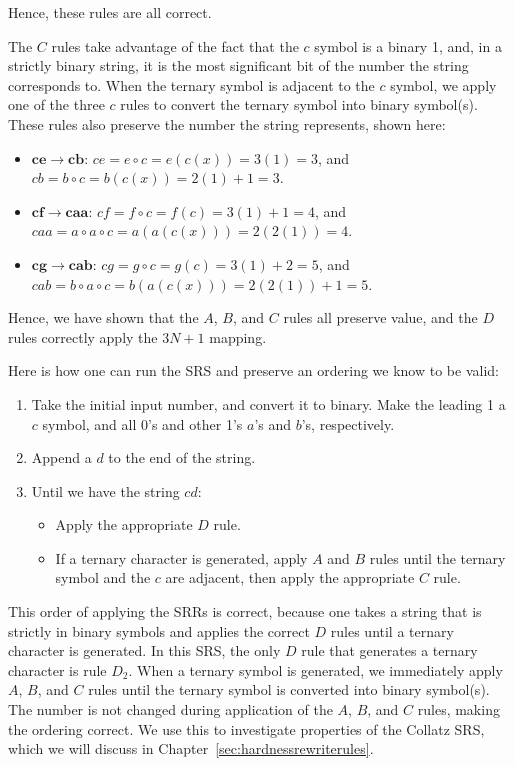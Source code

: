 Hence, these rules are all correct. \par
The $C$ rules take advantage of the fact that the $c$ symbol is a binary 1, and, in a strictly binary string, it is the most significant bit of the number the string corresponds to. When the ternary symbol is adjacent to the $c$ symbol, we apply one of the three $c$ rules to convert the ternary symbol into binary symbol(s). These rules also preserve the number the string represents, shown here:
\begin{itemize}
    \item $\boldsymbol{ce \rightarrow cb}$: $ce = e \circ c = e(c(x)) = 3(1) = 3$, and $cb = b
    \circ c = b(c(x)) = 2(1)+1 = 3$.
    \item $\boldsymbol{cf \rightarrow caa}$: $cf = f \circ c = f(c) = 3(1)+ 1 = 4$, and $caa = a \circ a \circ c = a(a(c(x))) = 2(2(1)) = 4$.
    \item $\boldsymbol{cg \rightarrow cab}$: $cg = g \circ c = g(c) = 3(1)+ 2 = 5$, and $cab = b \circ a \circ c = b(a(c(x))) = 2(2(1))+1 = 5$.
\end{itemize}
Hence, we have shown that the $A$, $B$, and $C$ rules all preserve value, and the $D$ rules correctly apply the $3N+1$ mapping. \par
Here is how one can run the SRS and preserve an ordering we know to be valid:
\begin{enumerate}
    \item Take the initial input number, and convert it to binary. Make the leading 1 a $c$ symbol, and all 0's and other 1's $a$'s and $b$'s, respectively.
    \item Append a $d$ to the end of the string.
    \item Until we have the string $cd$: 
    \begin{itemize}
        \item Apply the appropriate $D$ rule.
        \item If a ternary character is generated, apply $A$ and $B$ rules until the ternary symbol and the $c$ are adjacent, then apply the appropriate $C$ rule.
    \end{itemize}
\end{enumerate}
This order of applying the SRRs is correct, because one takes a string that is strictly in binary symbols and applies the correct $D$ rules until a ternary character is generated. In this SRS, the only $D$ rule that generates a ternary character is rule $D_2$. When a ternary symbol is generated, we immediately apply $A$, $B$, and $C$ rules until the ternary symbol is converted into binary symbol(s). The number is not changed during application of the $A$, $B$, and $C$ rules, making the ordering correct. We use this to investigate properties of the Collatz SRS, which we will discuss in Chapter~\ref{sec:hardnessrewriterules}. \par
